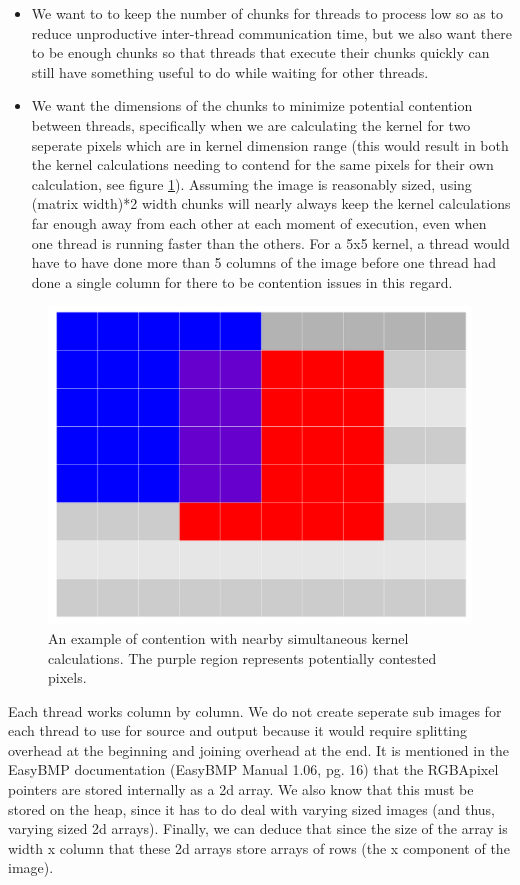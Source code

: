 \documentclass[paper=a4, fontsize=11pt]{scrartcl} %
\numberwithin{equation}{section} %
\numberwithin{figure}{section} %
\numberwithin{table}{section} %
\begin{document}
\begin{itemize}
\item We want to to keep the number of chunks for threads to process low so as to reduce unproductive inter-thread communication time, but we also want there to be enough chunks so that threads that execute their chunks quickly can still have something useful to do while waiting for other threads.
\item We want the dimensions of the chunks to minimize potential contention between threads, specifically when we are calculating the kernel for two seperate pixels which are in kernel dimension range (this would result in both the kernel calculations needing to contend for the same pixels for their own calculation, see figure \ref{kernels}). Assuming the image is reasonably sized, using (matrix width)*2 width chunks will nearly always keep the kernel calculations far enough away from each other at each moment of execution, even when one thread is running faster than the others. For a 5x5 kernel, a thread would have to have done more than 5 columns of the image before one thread had done a single column for there to be contention issues in this regard.
\end{itemize}


\begin{figure}[H]
	\centering
	\includegraphics[scale=0.2]{"Kernels"}
	\caption{An example of contention with nearby simultaneous kernel calculations. The purple region represents potentially contested pixels.}
        \label{kernels}
\end{figure}
  
Each thread works column by column. We do not create seperate sub images for each thread to use for source and output because it would require splitting overhead at the beginning and joining overhead at the end. It is mentioned in the EasyBMP documentation (EasyBMP Manual 1.06, pg. 16) that the RGBApixel pointers are stored internally as a 2d array. We also know that this must be stored on the heap, since it has to do deal with varying sized images (and thus, varying sized 2d arrays). Finally, we can deduce that since the size of the array is width x column that these 2d arrays store arrays of rows (the x component of the image).
\end{document}
